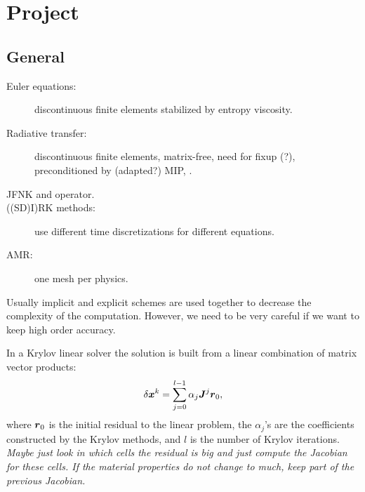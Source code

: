 \chapter{Project}
\section{General}
\begin{description}
  \item[Euler equations:] discontinuous finite elements stabilized by entropy
    viscosity.
  \item[Radiative transfer:] discontinuous finite elements, matrix-free,
    need for fixup (?), preconditioned by (adapted?) MIP, . 
  \item[JFNK and operator.]
  \item[((SD)I)RK methods:] use different time discretizations for different
    equations.
  \item[AMR:] one mesh per physics.
\end{description}
Usually implicit and explicit schemes are used together to decrease the
complexity of the computation. However, we need to be very careful if we want
to keep high order accuracy. 

In a Krylov linear solver the solution is built from a linear combination of
matrix vector products:
\begin{equation}
  \delta \boldsymbol{x}^k = \sum_{j=0}^{l-1} \alpha_j \boldsymbol{J}^j \boldsymbol{r}_0,
\end{equation}
where $\boldsymbol{r}_0$ is the initial residual to the linear problem, the
$\alpha_j$'s are the coefficients constructed by the Krylov methods, and $l$
is the number of Krylov iterations. \emph{Maybe just look in which cells the
residual is big and just compute the Jacobian for these cells. If the material
properties do not change to much, keep part of the previous Jacobian.}

